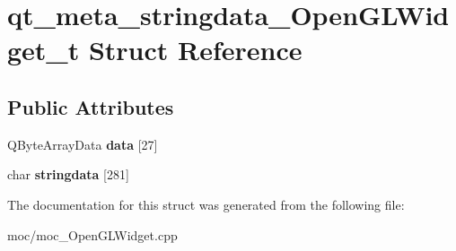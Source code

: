 \hypertarget{structqt__meta__stringdata___open_g_l_widget__t}{\section{qt\-\_\-meta\-\_\-stringdata\-\_\-\-Open\-G\-L\-Widget\-\_\-t Struct Reference}
\label{structqt__meta__stringdata___open_g_l_widget__t}
}
\subsection*{Public Attributes}
\begin{DoxyCompactItemize}
\item 
\hypertarget{structqt__meta__stringdata___open_g_l_widget__t_ae332b64ee182fb46ae72fb8072f69fb8}{Q\-Byte\-Array\-Data {\bfseries data} \mbox{[}27\mbox{]}}\label{structqt__meta__stringdata___open_g_l_widget__t_ae332b64ee182fb46ae72fb8072f69fb8}

\item 
\hypertarget{structqt__meta__stringdata___open_g_l_widget__t_a7462de5af308de6f2f48bb1b75974b2d}{char {\bfseries stringdata} \mbox{[}281\mbox{]}}\label{structqt__meta__stringdata___open_g_l_widget__t_a7462de5af308de6f2f48bb1b75974b2d}

\end{DoxyCompactItemize}


The documentation for this struct was generated from the following file\-:\begin{DoxyCompactItemize}
\item 
moc/moc\-\_\-\-Open\-G\-L\-Widget.\-cpp\end{DoxyCompactItemize}
